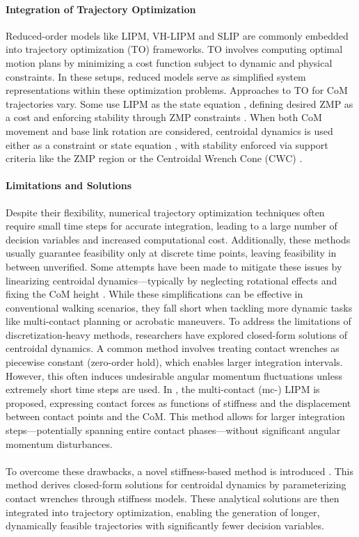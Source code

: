 \documentclass[main.tex]{subfiles}
\begin{document}
\begin{sloppypar}
\paragraph{Integration of Trajectory Optimization} Reduced-order models like LIPM, VH-LIPM and SLIP are commonly embedded into trajectory optimization (TO) frameworks. TO involves computing optimal motion plans by minimizing a cost function subject to dynamic and physical constraints. In these setups, reduced models serve as simplified system representations within these optimization problems. Approaches to TO for CoM trajectories vary. Some use LIPM as the state equation \cite{englsberger2017smooth, kamioka2018simultaneous}, defining desired ZMP as a cost \cite{tedrake2015closed} and enforcing stability through ZMP constraints \cite{kajita2003biped, murooka2022centroidal}. When both CoM movement and base link rotation are considered, centroidal dynamics is used either as a constraint or state equation \cite{kuindersma2016optimization, rossini2023real}, with stability enforced via support criteria like the ZMP region or the Centroidal Wrench Cone (CWC) \cite{ding2021nonlinear, dai2016planning}.
\paragraph{Limitations and Solutions} Despite their flexibility, numerical trajectory optimization techniques often require small time steps for accurate integration, leading to a large number of decision variables and increased computational cost. Additionally, these methods usually guarantee feasibility only at discrete time points, leaving feasibility in between unverified. Some attempts have been made to mitigate these issues by linearizing centroidal dynamics—typically by neglecting rotational effects and fixing the CoM height \cite{audren2014model}. While these simplifications can be effective in conventional walking scenarios, they fall short when tackling more dynamic tasks like multi-contact planning or acrobatic maneuvers. To address the limitations of discretization-heavy methods, researchers have explored closed-form solutions of centroidal dynamics. A common method involves treating contact wrenches as piecewise constant (zero-order hold), which enables larger integration intervals. However, this often induces undesirable angular momentum fluctuations unless extremely short time steps are used. In \cite{tazaki2022fast}, the multi-contact (mc-) LIPM is proposed, expressing contact forces as functions of stiffness and the displacement between contact points and the CoM. This method allows for larger integration steps—potentially spanning entire contact phases—without significant angular momentum disturbances. \\
\\
To overcome these drawbacks, a novel stiffness-based method is introduced \cite{tazaki2024trajectory}. This method derives closed-form solutions for centroidal dynamics by parameterizing contact wrenches through stiffness models. These analytical solutions are then integrated into trajectory optimization, enabling the generation of longer, dynamically feasible trajectories with significantly fewer decision variables.
\end{sloppypar}
\end{document}
